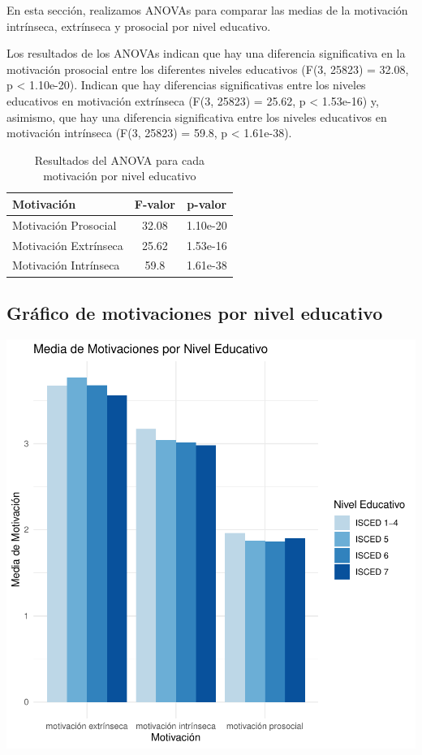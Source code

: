 \documentclass{article}
\begin{document}
En esta sección, realizamos ANOVAs para comparar las medias de la motivación intrínseca, extrínseca y prosocial por nivel educativo.


Los resultados de los ANOVAs indican que hay una diferencia significativa en la motivación prosocial entre los diferentes niveles educativos (F(3, 25823) = 32.08, p < 1.10e-20). Indican que hay diferencias significativas entre los niveles educativos en motivación extrínseca (F(3, 25823) = 25.62, p < 1.53e-16) y, asimismo, que hay una diferencia significativa entre los niveles educativos en motivación intrínseca (F(3, 25823) = 59.8, p < 1.61e-38).

\begin{table}[h!]
\centering
\caption{Resultados del ANOVA para cada motivación por nivel educativo}
\begin{tabular}{lcc}
  \toprule
  \textbf{Motivación} & \textbf{F-valor} & \textbf{p-valor} \\
  \midrule
  Motivación Prosocial & 32.08 & 1.10e-20 \\
  Motivación Extrínseca & 25.62 & 1.53e-16 \\
  Motivación Intrínseca & 59.8 & 1.61e-38 \\
  \bottomrule
\end{tabular}
\end{table}

\subsection{Gráfico de motivaciones por nivel educativo}
\includegraphics{Ejemplo-008}
\end{document}
